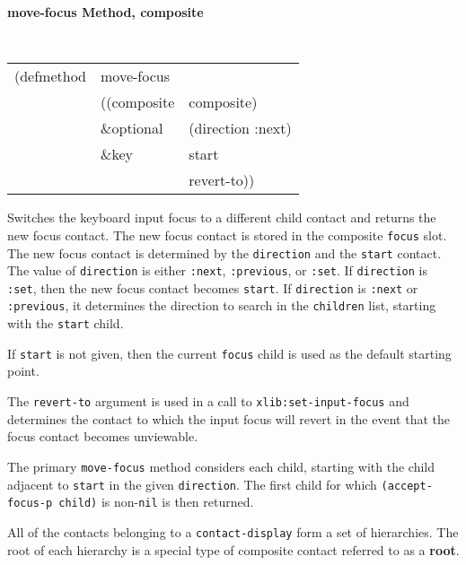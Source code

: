 {\samepage
{\large {\bf move-focus \hfill Method, composite}}
\begin{flushright} \parbox[t]{6.125in}{
\tt
\begin{tabular}{lll}
\raggedright
(defmethod & move-focus \\
           & ((composite & composite)\\
           & \&optional & (direction :next) \\
           & \&key           & start\\
           & & revert-to))
\end{tabular}
\rm

}\end{flushright}}

\begin{flushright} \parbox[t]{6.125in}{
Switches the keyboard input focus to a different child contact and returns the new focus
contact. The new focus contact is stored in the composite {\tt focus} slot.
The new focus contact is determined by the {\tt direction} and the {\tt start}
contact. The value of {\tt direction} is either {\tt :next}, {\tt :previous}, or
{\tt :set}. If {\tt direction} is {\tt :set}, then the new focus contact becomes
{\tt start}. If {\tt direction} is {\tt :next} or {\tt :previous}, it determines
the direction to search in the {\tt children} list, starting with
the {\tt start} child. 

If {\tt start} is not given, then the current {\tt focus}
child is used as the default starting point.

The {\tt revert-to} argument is used in a call to {\tt xlib:set-input-focus} and
determines the contact to which the input focus will revert in the event that
the focus contact becomes unviewable.

The primary {\tt move-focus} method considers each child, starting with
the child adjacent to {\tt start}
in the given {\tt direction}. The first child for which {\tt (accept-focus-p
child)} is non-{\tt nil} is then returned.

}\end{flushright}





All of the contacts belonging to a {\tt contact-display} form a set of
hierarchies. The root of each hierarchy is a special type of composite contact
referred to as a {\bf root}.



